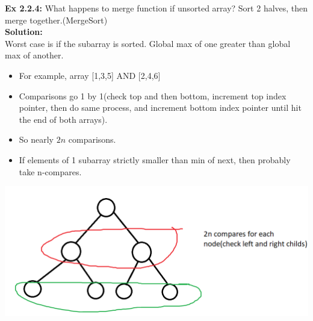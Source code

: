 \documentclass[11pt,fleqn]{article}
\begin{document}
\textbf{Ex 2.2.4:} What happens to merge function if unsorted array? Sort 2 halves, then merge together.(MergeSort)\\

\textbf{Solution:}\\
Worst case is if the subarray is sorted. Global max of one greater than global max of another.

\begin{itemize}
	\item For example, array [1,3,5] AND [2,4,6]
	\item Comparisons go 1 by 1(check top and then bottom, increment top index pointer, then do same process, and increment bottom index pointer until hit the end of both arrays).
	\item So nearly $2n$ comparisons.
	\item If elements of 1 subarray strictly smaller than min of next, then probably take n-compares.
	
\end{itemize}

\begin{center}
 \includegraphics[scale=0.6]{2.2.4.png}
\end{center}
\end{document}
